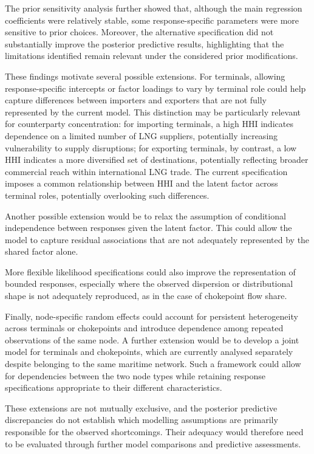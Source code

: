 \documentclass[pdftex,12pt,openright,a4paper,oneside]{book}
\begin{document}
The prior sensitivity analysis further showed that,
although the main regression coefficients were relatively
stable, some response-specific parameters were more
sensitive to prior choices. Moreover, the alternative
specification did not substantially improve the
posterior predictive results, highlighting that the limitations 
identified remain relevant under the considered prior
modifications.

These findings motivate several possible extensions.
For terminals, allowing response-specific intercepts
or factor loadings to vary by terminal role could help
capture differences between importers and exporters
that are not fully represented by the current model.
This distinction may be particularly relevant for
counterparty concentration: for importing terminals,
a high HHI indicates dependence on a limited number
of LNG suppliers, potentially increasing vulnerability
to supply disruptions; for exporting terminals,
by contrast, a low HHI indicates a more diversified
set of destinations, potentially reflecting broader
commercial reach within international LNG trade.
The current specification imposes a common relationship between
HHI and the latent factor across terminal roles,
potentially overlooking such differences.

Another possible extension would be to relax the
assumption of conditional independence between
responses given the latent factor. This could allow
the model to capture residual associations that
are not adequately represented by the shared
factor alone.

More flexible likelihood specifications could also
improve the representation of bounded responses,
especially where the observed dispersion or
distributional shape is not adequately reproduced,
as in the case of chokepoint flow share.

Finally, node-specific random effects could account for
persistent heterogeneity across terminals or
chokepoints and introduce dependence among
repeated observations of the same node.
A further extension would be to develop a joint
model for terminals and chokepoints, which are
currently analysed separately despite belonging
to the same maritime network. Such a framework
could allow for dependencies between the two node
types while retaining response specifications
appropriate to their different characteristics.

These extensions are not mutually exclusive, and
the posterior predictive discrepancies do not
establish which modelling assumptions are primarily
responsible for the observed shortcomings.
Their adequacy would therefore need to be evaluated
through further model comparisons and predictive
assessments.
\end{document}
